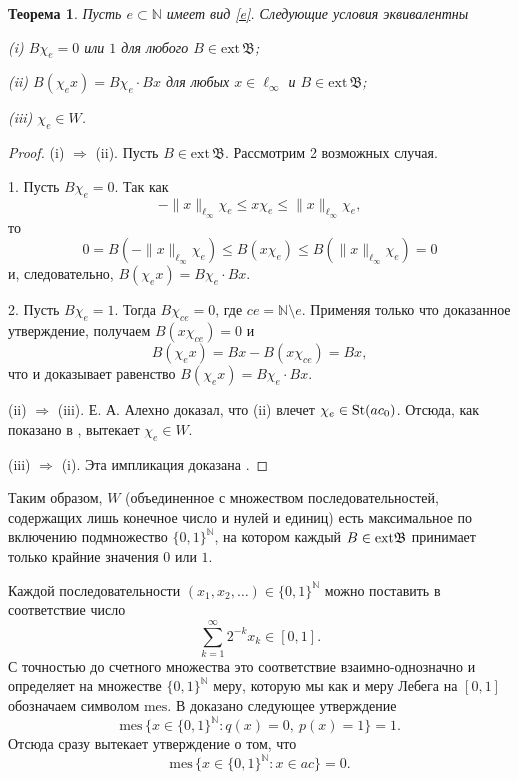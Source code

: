 \documentclass[12pt]{article}
\newtheorem{thm}{Теорема}
\def\N{{\mathbb{N}}}
\def\B{{\mathfrak{B}}}
\def\ext{{\mathrm{ext}\,}}
\def\mes{{\mathrm{mes}}}
\begin{document}
\begin{thm}\label{thm1}
Пусть $e\subset \N$ имеет вид \eqref{e}. Следующие условия эквивалентны

(i) $B\chi_e=0$ или $1$ для любого $B\in \ext\B$;

(ii) $B(\chi_e x)= B\chi_e \cdot Bx$ для любых $x\in \ell_\infty$ и $B\in \ext\B$;

(iii) $\chi_e\in W$.
\end{thm}

\begin{proof}
(i) $\Longrightarrow$ (ii). Пусть $B\in \ext\B$. Рассмотрим 2 возможных случая.

1. Пусть $B\chi_e=0$. Так как
$$-\|x\|_{\ell_\infty}\chi_e \le x \chi_e \le \|x\|_{\ell_\infty}\chi_e,$$
то
$$0=B(-\|x\|_{\ell_\infty}\chi_e) \le B(x \chi_e) \le B(\|x\|_{\ell_\infty}\chi_e)=0$$
и, следовательно, $B(\chi_e x)= B\chi_e \cdot Bx$.

2. Пусть $B\chi_e=1$. Тогда $B\chi_{ce}=0$, где $ce=\N\setminus e$. Применяя только что доказанное утверждение, получаем $B(x\chi_{ce})=0$ и
$$B(\chi_e x)= Bx - B(x\chi_{ce})= Bx,$$
что и доказывает равенство $B(\chi_e x)= B\chi_e \cdot Bx$.


(ii) $\Longrightarrow$ (iii). Е. А. Алехно \cite[Утверждение 2.3]{Alekhno} доказал, что (ii) влечет $\chi_e \in {\rm St}(ac_0)$. Отсюда, как показано в  \cite[Лемма 35]{SSU2}, вытекает $\chi_e\in W$.

(iii) $\Longrightarrow$ (i). Эта импликация доказана \cite[Следствие 29]{SSU2}.
\end{proof}

Таким образом, $W$ (объединенное с множеством последовательностей, содержащих лишь конечное число и нулей и единиц) есть максимальное по включению подмножество $\{0,1\}^\N$, на котором каждый $B\in {\rm ext}\mathfrak B$ принимает только крайние значения $0$ или $1$.

Каждой последовательности $(x_1, x_2, \dots)\in \{0,1\}^\N$ можно поставить в соответствие число
$$\sum_{k=1}^\infty 2^{-k} x_k \in [0,1].$$
С точностью до счетного множества это соответствие взаимно-однозначно и определяет на множестве $\{0,1\}^\N$ меру, которую мы как и меру Лебега на $[0,1]$ обозначаем символом $\mes$. В \cite{SS} доказано следующее утверждение
$$ \mes \, \{x\in \{0,1\}^\N: q(x)=0, \ p(x)=1\}=1.$$ Отсюда сразу вытекает утверждение \cite{Connor} о том, что
\begin{equation}\label{ac_meas}
\mes \, \{x\in \{0,1\}^\N: x\in ac\}=0.
\end{equation}
\end{document}
